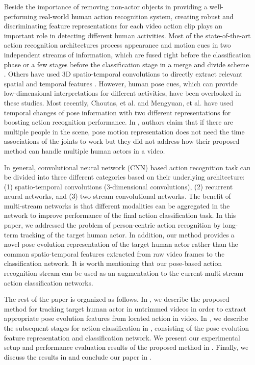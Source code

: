 Beside the importance of removing non-actor objects in providing a well-performing real-world human action recognition system, creating robust and discriminating feature representations for each video action clip plays an important role in detecting different human activities. Most of the state-of-the-art action recognition architectures process appearance and motion cues in two independent streams of information, which are fused right before the classification phase or a few stages before the classification stage in a merge and divide scheme \cite{li2018detecting, simonyan2014two}. Others have used 3D spatio-temporal convolutions to directly extract relevant spatial and temporal features \cite{zhou2018mict, tran2018closer, tran2015learning}. However, human pose cues, which can provide low-dimensional interpretations for different activities, have been overlooked in these studies. 
Most recently, Choutas, et al. \cite{liu2018recognizing} and Mengyuan, et al. \cite{choutas2018potion} have used temporal changes of pose information with two different representations for boosting action recognition performance. In \cite{choutas2018potion}, authors claim that if there are multiple people in the scene, pose motion representation does not need the time associations of the joints to work but they did not address how their proposed method can handle multiple human actors in a video.

In general, convolutional neural network (CNN) based action recognition task can be divided into three different categories based on their underlying architecture: (1) spatio-temporal convolutions (3-dimensional convolutions), (2) recurrent neural networks, and (3) two stream convolutional networks.
The benefit of multi-stream networks is that different modalities can be aggregated in the network to improve performance of the final action classification task. In this paper, we addressed the problem of person-centric action recognition by long-term tracking of the target human actor. In addition, our method provides a novel pose evolution representation of the target human actor rather than the common spatio-temporal features extracted from raw video frames to the classification network. It is worth mentioning that our pose-based action recognition stream can be used as an augmentation to the current multi-stream action classification networks.

The rest of the paper is organized as follows. In , we describe the proposed method for tracking target human actor in untrimmed videos in order to extract appropriate pose evolution features from located action in video. In , we describe the subsequent stages for action classification in , consisting of the pose evolution feature representation and classification network. We present our experimental setup and performance evaluation results of the proposed method in . Finally, we discuss the results in  and conclude our paper in .